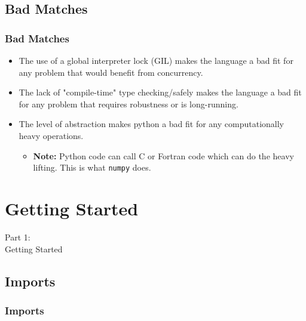 \subsection{Bad Matches}
\begin{frame}
    \frametitle{Bad Matches}
    \vspace{5mm}
    
    \pause
    \begin{itemize}
      \item The use of a global interpreter lock (GIL) makes the language a bad fit for any problem that would benefit from concurrency.
      \pause
      \item The lack of "compile-time" type checking/safely makes the language a bad fit for any problem that requires robustness or is long-running.
      \pause
      \item The level of abstraction makes python a bad fit for any computationally heavy operations.
      \pause
          \begin{itemize}
              \item \textbf{Note:} Python code can call C or Fortran code which can do the heavy lifting. This is what \texttt{numpy} does.
          \end{itemize}
    \end{itemize}
\end{frame}


\section{Getting Started}
\begin{frame}
    \vspace{25mm}
    \begin{center}
        \Huge{Part 1:\\Getting Started}
    \end{center}
\end{frame}

\subsection{Imports}
\begin{frame}
    \frametitle{Imports}
    \vspace{3mm}
    \contentImports
\end{frame}

